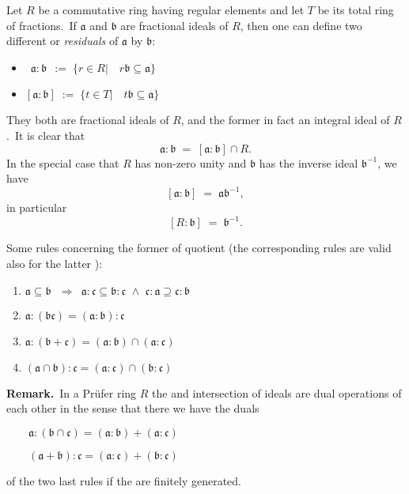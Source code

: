 \documentclass[12pt]{article}
\begin{document}
Let $R$ be a commutative ring having regular elements and let $T$ be its total ring of fractions.\, If $\mathfrak{a}$ and $\mathfrak{b}$ are fractional ideals of $R$, then one can define two different  or {\em residuals} of $\mathfrak{a}$ by $\mathfrak{b}$:
\begin{itemize}
 \item \, $\mathfrak{a\!:\!b}\, \;:=\; 
     \{r\in R|\quad r\mathfrak{b} \subseteq \mathfrak{a}\}$
 \item $[\mathfrak{a\!:\!b}] \;:=\; 
     \{t\in T|\quad t\mathfrak{b} \subseteq \mathfrak{a}\}$
\end{itemize}

They both are fractional ideals of $R$, and the former in fact an integral ideal of $R$.\, It is clear that 
$$\mathfrak{a\!:\!b} \;=\; [\mathfrak{a\!:\!b}]\cap\!R.$$
In the special case that $R$ has non-zero unity and $\mathfrak{b}$ has the inverse ideal $\mathfrak{b}^{-1}$, we have
$$[\mathfrak{a\!:\!b}] \;=\; \mathfrak{a}\mathfrak{b}^{-1},$$
in particular
$$[R\!:\!\mathfrak{b}] \;=\; \mathfrak{b}^{-1}.$$

Some rules concerning the former  of quotient (the corresponding rules are valid also for the latter ):
\begin{enumerate}
 \item $\mathfrak{a}\subseteq\mathfrak{b}\,\,\,\,\Rightarrow\,\,\,
\mathfrak{a}:\mathfrak{c}\subseteq\mathfrak{b}:\mathfrak{c}\,\,
\land\,\,\mathfrak{c}:\mathfrak{a}\supseteq\mathfrak{c}:\mathfrak{b}$
 \item $\mathfrak{a}:(\mathfrak{b}\mathfrak{c}) =    (\mathfrak{a}:\mathfrak{b}):\mathfrak{c}$ 
\item $\mathfrak{a}:(\mathfrak{b}+\mathfrak{c})= (\mathfrak{a}:\mathfrak{b})\cap(\mathfrak{a}:\mathfrak{c})$
 \item $(\mathfrak{a}\cap\mathfrak{b}):\mathfrak{c} = (\mathfrak{a}:\mathfrak{c})\cap(\mathfrak{b}:\mathfrak{c})$
\end{enumerate}


\textbf{Remark.} \,In a Pr\"ufer ring $R$ the  and intersection of ideals are dual operations of each other in the sense that there we have the duals

$\quad\quad \mathfrak{a}:(\mathfrak{b}\cap\mathfrak{c}) = (\mathfrak{a}:\mathfrak{b})+(\mathfrak{a}:\mathfrak{c})$

$\quad\quad (\mathfrak{a}+\mathfrak{b}):\mathfrak{c} = (\mathfrak{a}:\mathfrak{c})+(\mathfrak{b}:\mathfrak{c})$

of the two last rules if the  are finitely generated.
\end{document}
